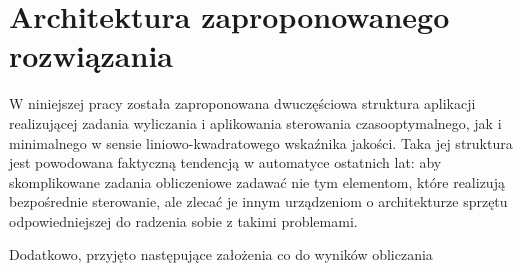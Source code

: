 \chapter{Architektura zaproponowanego rozwiązania}
\label{cha:arch}

W niniejszej pracy została zaproponowana dwuczęściowa struktura aplikacji realizującej zadania wyliczania i aplikowania sterowania czasooptymalnego, jak i minimalnego w sensie liniowo-kwadratowego wskaźnika jakości. Taka jej struktura jest powodowana faktyczną tendencją w automatyce ostatnich lat: aby skomplikowane zadania obliczeniowe zadawać nie tym elementom, które realizują bezpośrednie sterowanie, ale zlecać je innym urządzeniom o architekturze sprzętu odpowiedniejszej do radzenia sobie z takimi problemami.

Dodatkowo, przyjęto następujące założenia co do wyników obliczania








